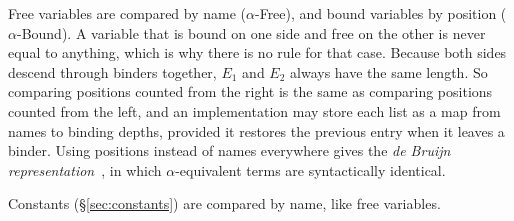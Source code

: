 \documentclass[acmsmall,screen,nonacm]{acmart}
\begin{document}
Free variables are compared by name ($\alpha$-Free), and bound variables by position ($\alpha$-Bound). A variable that is bound on
one side and free on the other is never equal to anything, which is why there is no rule for that case. Because both sides descend
through binders together, $E_1$ and $E_2$ always have the same length. So comparing positions counted from the right is the same
as comparing positions counted from the left, and an implementation may store each list as a map from names to binding depths,
provided it restores the previous entry when it leaves a binder. Using positions instead of names everywhere gives the
\emph{de Bruijn representation}~\cite{debruijn1972nameless}, in which $\alpha$-equivalent terms are syntactically identical.

Constants (\S\ref{sec:constants}) are compared by name, like free variables.
\end{document}
